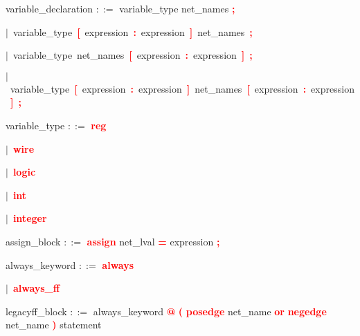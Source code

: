 \vspace{1em}
\noindent
\settowidth{\parindent}{\hspace{4ex}}
variable\_declaration $::=$\hspace{1ex} variable\_type net\_names \textbf{\textcolor{red}{;}}

\mbox{$|$ variable\_type \textbf{\textcolor{red}{[}} expression \textbf{\textcolor{red}{:}} expression \textbf{\textcolor{red}{]}} net\_names \textbf{\textcolor{red}{;}}}

\mbox{$|$ variable\_type net\_names \textbf{\textcolor{red}{[}} expression \textbf{\textcolor{red}{:}} expression \textbf{\textcolor{red}{]}} \textbf{\textcolor{red}{;}}}

\mbox{$|$ variable\_type \textbf{\textcolor{red}{[}} expression \textbf{\textcolor{red}{:}} expression \textbf{\textcolor{red}{]}} net\_names \textbf{\textcolor{red}{[}} expression \textbf{\textcolor{red}{:}} expression \textbf{\textcolor{red}{]}} \textbf{\textcolor{red}{;}}}

\vspace{1em}
\noindent
\settowidth{\parindent}{\hspace{4ex}}
variable\_type $::=$\hspace{1ex} \textbf{\textcolor{red}{reg}}

\mbox{$|$ \textbf{\textcolor{red}{wire}}}

\mbox{$|$ \textbf{\textcolor{red}{logic}}}

\mbox{$|$ \textbf{\textcolor{red}{int}}}

\mbox{$|$ \textbf{\textcolor{red}{integer}}}

\vspace{1em}
\noindent
\settowidth{\parindent}{\hspace{4ex}}
assign\_block $::=$\hspace{1ex} \textbf{\textcolor{red}{assign}} net\_lval \textbf{\textcolor{red}{=}} expression \textbf{\textcolor{red}{;}}

\vspace{1em}
\noindent
\settowidth{\parindent}{\hspace{4ex}}
always\_keyword $::=$\hspace{1ex} \textbf{\textcolor{red}{always}}

\mbox{$|$ \textbf{\textcolor{red}{always\_ff}}}

\vspace{1em}
\noindent
\settowidth{\parindent}{\hspace{4ex}}
legacyff\_block $::=$\hspace{1ex} always\_keyword \textbf{\textcolor{red}{@}} \textbf{\textcolor{red}{(}} \textbf{\textcolor{red}{posedge}} net\_name \textbf{\textcolor{red}{or}} \textbf{\textcolor{red}{negedge}} net\_name \textbf{\textcolor{red}{)}} statement

